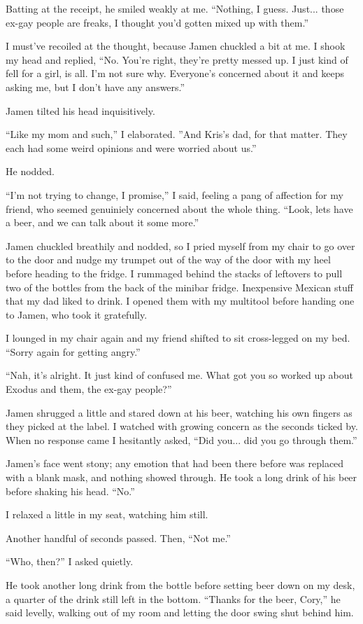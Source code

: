 Batting at the receipt, he smiled weakly at me.  ``Nothing, I guess.  Just... those ex-gay people are freaks, I thought you'd gotten mixed up with them.''

I must've recoiled at the thought, because Jamen chuckled a bit at me.  I shook my head and replied, ``No.  You're right, they're pretty messed up.  I just kind of fell for a girl, is all.  I'm not sure why.  Everyone's concerned about it and keeps asking me, but I don't have any answers.''

Jamen tilted his head inquisitively.

``Like my mom and such,'' I elaborated.  ''And Kris's dad, for that matter.  They each had some weird opinions and were worried about us.''

He nodded.

``I'm not trying to change, I promise,'' I said, feeling a pang of affection for my friend, who seemed genuiniely concerned about the whole thing.  ``Look, lets have a beer, and we can talk about it some more.''

Jamen chuckled breathily and nodded, so I pried myself from my chair to go over to the door and nudge my trumpet out of the way of the door with my heel before heading to the fridge.  I rummaged behind the stacks of leftovers to pull two of the bottles from the back of the minibar fridge.  Inexpensive Mexican stuff that my dad liked to drink.  I opened them with my multitool before handing one to Jamen, who took it gratefully.

I lounged in my chair again and my friend shifted to sit cross-legged on my bed.  ``Sorry again for getting angry.''

``Nah, it's alright.  It just kind of confused me.  What got you so worked up about Exodus and them, the ex-gay people?''

Jamen shrugged a little and stared down at his beer, watching his own fingers as they picked at the label.  I watched with growing concern as the seconds ticked by.  When no response came I hesitantly asked, ``Did you... did you go through them.''

Jamen's face went stony; any emotion that had been there before was replaced with a blank mask, and nothing showed through.  He took a long drink of his beer before shaking his head.  ``No.''

I relaxed a little in my seat, watching him still.

Another handful of seconds passed.  Then, ``Not me.''

``Who, then?'' I asked quietly.

He took another long drink from the bottle before setting beer down on my desk, a quarter of the drink still left in the bottom.  ``Thanks for the beer, Cory,'' he said levelly, walking out of my room and letting the door swing shut behind him.
